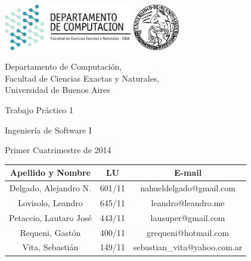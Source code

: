 \documentclass[a4paper, 10pt, twoside]{article}
\begin{document}


\thispagestyle{caratula}

\begin{center}

\includegraphics[height=2cm]{DC.png} 
\hfill
\includegraphics[height=2cm]{UBA.jpg} 

\vspace{2cm}

Departamento de Computación,\\
Facultad de Ciencias Exactas y Naturales,\\
Universidad de Buenos Aires

\vspace{4cm}

\begin{Huge}
Trabajo Práctico 1
\end{Huge}

\vspace{0.5cm}

\begin{Large}
Ingeniería de Software I
\end{Large}

\vspace{1cm}

Primer Cuatrimestre de 2014

\vspace{4cm}

\begin{tabular}{|c|c|c|}
\hline
Apellido y Nombre & LU & E-mail\\
\hline
Delgado, Alejandro N.  & 601/11 & nahueldelgado@gmail.com\\
Lovisolo, Leandro      & 645/11 & leandro@leandro.me\\
Petaccio, Lautaro José & 443/11 & lausuper@gmail.com\\
Requeni, Gastón        & 400/11 & grequeni@hotmail.com\\
Vita, Sebastián        & 149/11 & sebastian\_vita@yahoo.com.ar\\
\hline
\end{tabular}

\end{center}
\end{document}
